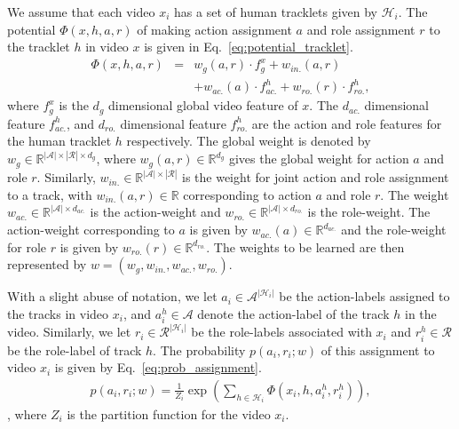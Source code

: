 \documentclass[10pt,twocolumn,letterpaper]{article}
\begin{document}
We assume that each video $x_i$ has a set of human tracklets given by $\mathcal{H}_i$. 
The potential $\Phi(x, h, a, r)$ of making
action assignment $a$ and role assignment $r$ to the tracklet $h$ in video $x$ is given in Eq.~\ref{eq:potential_tracklet}.
\vspace{-4pt}
\begin{eqnarray}\label{eq:potential_tracklet}
  \Phi(x, h, a, r) & = & w_{g}(a,r) \cdot f_{g}^x + w_{in.}(a,r) \\ \nonumber
                   & & + w_{ac.}(a) \cdot f_{ac.}^h + w_{ro.}(r) \cdot f_{ro.}^h, \nonumber
\end{eqnarray} where $f_g^x$ is the $d_g$ dimensional global video feature of $x$. The $d_{ac.}$ dimensional feature
$f_{ac.}^h$, and $d_{ro.}$ dimensional feature $f_{ro.}^h$ are the action and role features 
for the human tracklet $h$ respectively. The global weight is denoted 
by $w_g \in \mathbb{R}^{|\mathcal{A}| \times |\mathcal{R}| \times d_g}$, where $w_g(a,r) \in \mathbb{R}^{d_g}$
gives the global weight for action $a$ and role $r$.
Similarly, $w_{in.} \in \mathbb{R}^{|\mathcal{A}| \times |\mathcal{R}|}$ is the weight for joint 
action and role assignment to a track, with $w_{in.}(a,r) \in \mathbb{R}$ corresponding to action $a$ and role $r$. 
The weight $w_{ac.} \in \mathbb{R}^{|\mathcal{A}| \times d_{ac.}}$
is the action-weight and $w_{ro.} \in \mathbb{R}^{|\mathcal{A}| \times d_{ro.}}$ is the role-weight. The action-weight corresponding
to $a$ is given by $w_{ac.}(a) \in \mathbb{R}^{d_{ac.}}$ and the role-weight for role $r$ is given by $w_{ro.}(r) \in \mathbb{R}^{d_{ro.}}$.
The weights to be learned are then represented by $w = (w_g, w_{in.}, w_{ac.}, w_{ro.})$.

With a slight abuse of notation, we let $a_i \in \mathcal{A}^{|\mathcal{H}_i|}$ be the action-labels assigned to the tracks in video $x_i$, 
and $a_i^h \in \mathcal{A}$ denote the action-label of the track $h$ in the video. 
Similarly, we let $r_i \in \mathcal{R}^{|\mathcal{H}_i|}$ be the role-labels associated with $x_i$ and $r_i^h \in \mathcal{R}$ be the role-label of track $h$.
The probability $p(a_i, r_i; w)$ of this assignment to video $x_i$ is given by Eq.~\ref{eq:prob_assignment}.
\vspace{-4pt}
\begin{eqnarray}\label{eq:prob_assignment}
  p(a_i, r_i; w) = \frac{1}{Z_i} \exp \left(\sum \limits_{h \in \mathcal{H}_i} \Phi(x_i, h, a_i^h, r_i^h) \right),
\end{eqnarray}, where $Z_i$ is the partition function for the video $x_i$.
\end{document}
